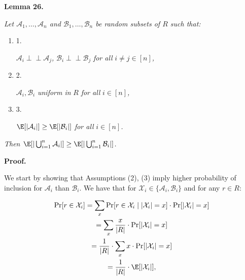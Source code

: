 

\par\medskip\noindent\textbf{\textbf{Lemma 26}\textbf{.}}\par



\emph{Let $\mathcal{A}_{1},\dots,\mathcal{A}_{n}$ and $\mathcal{B}_{1},\dots,\mathcal{B}_{n}$ be random subsets of $R$ such that:}\par


\begin{enumerate}


\item[] 1. 


$\mathcal{A}_{i}\perp\!\!\!\!\perp\mathcal{A}_{j}$\emph{, }$\mathcal{B}_{i}\perp\!\!\!\!\perp\mathcal{B}_{j}$\emph{ for all }$i\neq j\in[n]$\emph{,}\par




\item[] 2. 


$\mathcal{A}_{i},\mathcal{B}_{i}$\emph{ uniform in }$R$\emph{ for all }$i\in[n]$\emph{,}\par




\item[] 3. 


$\E[|\mathcal{A}_{i}|]\geq\E[|\mathcal{B}_{i}|]$\emph{ for all }$i\in[n]$\emph{.}\par




\end{enumerate}


\emph{Then $\E[|\bigcup_{i=1}^{n}\mathcal{A}_{i}|]\geq\E[|\bigcup_{i=1}^{n}\mathcal{B}_{i}|]$.}\par






\par\medskip\noindent\textbf{Proof.}\par



We start by showing that Assumptions (2), (3) imply higher probability of inclusion for $\mathcal{A}_{i}$ than $\mathcal{B}_{i}$.
We have that for $\mathcal{X}_{i}\in\{\mathcal{A}_{i},\mathcal{B}_{i}\}$ and for any $r\in R$:\par


\[\begin{gathered}
\displaystyle\Pr[r\in\mathcal{X}_{i}] \displaystyle=\sum_{x}{\Pr[r\in\mathcal{X}_{i}\mid|\mathcal{X}_{i}|=x]\cdot\Pr[|\mathcal{X}_{i}|=x]} \\
\displaystyle=\sum_{x}{\frac{x}{|R|}\cdot\Pr[|\mathcal{X}_{i}|=x]} \\
\displaystyle=\frac{1}{|R|}\cdot\sum_{x}{x\cdot\Pr[|\mathcal{X}_{i}|=x]} \\
\displaystyle=\frac{1}{|R|}\cdot\E[|\mathcal{X}_{i}|],
\end{gathered}\]


